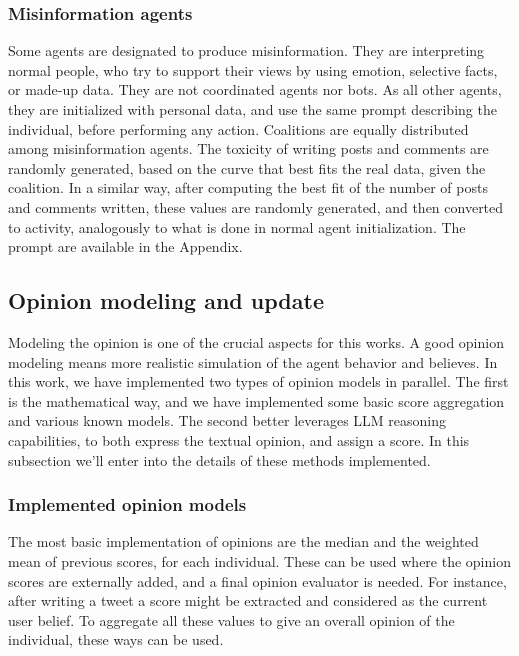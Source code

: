 \subsubsection{Misinformation agents}
Some agents are designated to produce misinformation. They are interpreting normal people, who try to support their views by using emotion, selective facts, or made-up data. They are not coordinated agents nor bots.
As all other agents, they are initialized with personal data, and use the same prompt describing the individual, before performing any action.
Coalitions are equally distributed among misinformation agents.
The toxicity of writing posts and comments are randomly generated, based on the curve that best fits the real data, given the coalition.
In a similar way, after computing the best fit of the number of posts and comments written, these values are randomly generated, and then converted to activity, analogously to what is done in normal agent initialization.
The prompt are available in the Appendix.

\subsection{Opinion modeling and update}
Modeling the opinion is one of the crucial aspects for this works. A good opinion modeling means more realistic simulation of the agent behavior and believes.
In this work, we have implemented two types of opinion models in parallel. The first is the mathematical way, and we have implemented some basic score aggregation and various known models. The second better leverages LLM reasoning capabilities, to both express the textual opinion, and assign a score. 
In this subsection we'll enter into the details of these methods implemented.

\subsubsection{Implemented opinion models}
The most basic implementation of opinions are the median and the weighted mean of previous scores, for each individual. These can be used where the opinion scores are externally added, and a final opinion evaluator is needed. For instance, after writing a tweet a score might be extracted and considered as the current user belief. To aggregate all these values to give an overall opinion of the individual, these ways can be used.

